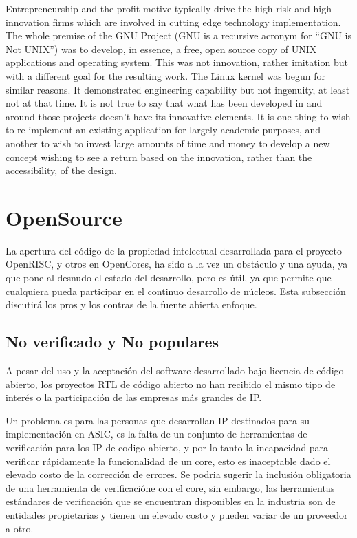 Entrepreneurship and the profit motive typically drive the high risk and high innovation
firms which are involved in cutting edge technology implementation. The
whole premise of the GNU Project (GNU is a recursive acronym for “GNU is Not
UNIX”) was to develop, in essence, a free, open source copy of UNIX applications
and operating system. This was not innovation, rather imitation but with a different
goal for the resulting work. The Linux kernel was begun for similar reasons.
It demonstrated engineering capability but not ingenuity, at least not at that time.
It is not true to say that what has been developed in and around those projects
doesn’t have its innovative elements. It is one thing to wish to re-implement an
existing application for largely academic purposes, and another to wish to invest
large amounts of time and money to develop a new concept wishing to see a return
based on the innovation, rather than the accessibility, of the design.





\section {OpenSource}

La apertura del código de la propiedad intelectual desarrollada para el proyecto OpenRISC, y otros en OpenCores, ha sido a la vez un obstáculo y una ayuda, ya que pone al desnudo el estado del desarrollo, pero es útil, ya que permite que cualquiera pueda participar en el continuo desarrollo de núcleos. Esta subsección discutirá los pros y los contras de la fuente abierta enfoque.

		\subsection{No verificado y No populares}

A pesar del uso y la aceptación del software desarrollado bajo licencia de código abierto, los proyectos RTL de código abierto no han recibido el mismo tipo de interés o la participación de las empresas más grandes de IP. 

Un problema es para las personas que desarrollan IP destinados para su implementación en ASIC, es la falta de un conjunto de herramientas de verificación para los IP de codigo abierto, y por lo tanto la incapacidad para verificar rápidamente la funcionalidad de un core, esto es inaceptable dado el elevado costo de la corrección de errores. Se podria sugerir la inclusión obligatoria de una herramienta de verificacióne con el core, sin embargo, las herramientas estándares de verificación que se encuentran disponibles en la industria son de entidades propietarias y tienen un elevado costo y pueden variar de un proveedor a otro. 

